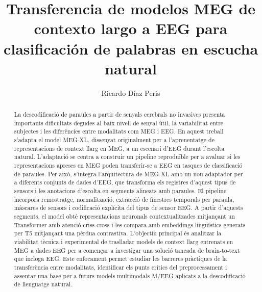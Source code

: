 \documentclass[11pt,spanish,listoffigures,listoftables]{tfgetsinf}
\title{Transferencia de modelos MEG de contexto largo a EEG para clasificación de palabras en escucha natural
}
\author{Ricardo Díaz Peris}
\begin{document}



\begin{abstract}
La descodificació de paraules a partir de senyals cerebrals no invasives presenta importants dificultats degudes al baix nivell de senyal útil, la variabilitat entre subjectes i les diferències entre modalitats com MEG i EEG. En aquest treball s’adapta el model MEG-XL, dissenyat originalment per a l'aprenentatge de representacions de context llarg en MEG, a un escenari d'EEG durant l'escolta natural. L'adaptació se centra a construir un pipeline reproduïble per a avaluar si les representacions apreses en MEG poden transferir-se a EEG en tasques de classificació de paraules.
Per això, s'integra l'arquitectura de MEG-XL amb un nou adaptador per a diferents conjunts de dades d’EEG, que transforma els registres d'aquest tipus de sensors i les anotacions d'escolta en segments alineats amb paraules. El pipeline incorpora remostratge, normalització, extracció de finestres temporals per paraula, màscares de sensors i codificació explícita del tipus de sensor EEG. A partir d'aquests segments, el model obté representacions neuronals contextualitzades mitjançant un Transformer amb atenció criss-cross i les compara amb embeddings lingüístics generats per T5 mitjançant una pèrdua contrastiva.
L'objectiu principal és analitzar la viabilitat tècnica i experimental de traslladar models de context llarg entrenats en MEG a dades EEG per a començar a investigar una solució tancada de brain-to-text que incloga EEG. Este enfocament permet estudiar les barreres pràctiques de la transferència entre modalitats, identificar els punts crítics del preprocessament i assentar una base per a futurs models multimodals M/EEG aplicats a la descodificació de llenguatge natural.
\end{abstract}
\end{document}
